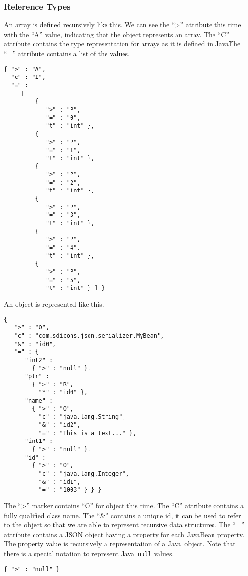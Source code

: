 \documentclass[a4paper]{article}
\newcommand{\java}{Java}
\begin{document}
\subsubsection{Reference Types}

An array is defined recursively like this. We can see the ``>'' attribute this time with the ``A''  value, indicating that the object represents an array. The ``C'' attribute contains the type representation for arrays as it is defined in \java\. The ``=''  attribute contains a list of the values.

\medskip
\begin{lstlisting}
{ ">" : "A",
  "c" : "I",
  "=" :
     [
         {
            ">" : "P",
            "=" : "0",
            "t" : "int" },
         {
            ">" : "P",
            "=" : "1",
            "t" : "int" },
         {
            ">" : "P",
            "=" : "2",
            "t" : "int" },
         {
            ">" : "P",
            "=" : "3",
            "t" : "int" },
         {
            ">" : "P",
            "=" : "4",
            "t" : "int" },
         {
            ">" : "P",
            "=" : "5",
            "t" : "int" } ] }
\end{lstlisting}
\medskip

An object is represented like this.

\medskip
\begin{lstlisting}
{
   ">" : "O",
   "c" : "com.sdicons.json.serializer.MyBean",
   "&" : "id0",
   "=" : {
      "int2" :
        { ">" : "null" },
      "ptr" :
        { ">" : "R",
          "*" : "id0" },
      "name" :
        { ">" : "O",
          "c" : "java.lang.String",
          "&" : "id2",
          "=" : "This is a test..." },
      "int1" :
        { ">" : "null" },
      "id" :
        { ">" : "O",
          "c" : "java.lang.Integer",      
          "&" : "id1",
          "=" : "1003" } } }
\end{lstlisting}
\medskip

The ``>'' marker contains ``O'' for object this time. The ``C'' attribute contains a fully qualified class name. The ``\&'' contains a unique id, it can be used to refer to the object so that we are able to represent recursive data structures. The ``=''  attribute contains a JSON object having a property for each JavaBean property.  The property value is recursively a representation of a \java\ object. Note that there is a special notation to represent \java\ \lstinline{null} values.

\medskip
\begin{lstlisting}
{ ">" : "null" }
\end{lstlisting}
\medskip
\end{document}
